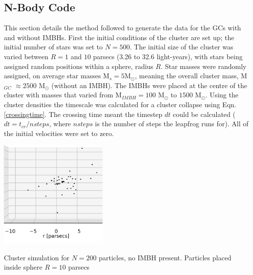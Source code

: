 \documentclass{article}
\begin{document}
\begin{multicols}{2}
\subsection{N-Body Code}
This section details the method followed to generate the data for the GCs with and without IMBHs. First the initial conditions of the cluster are set up; the initial number of stars was set to $N=500$. The initial size of the cluster was varied between $R = 1$ and $10$ parsecs (3.26 to 32.6 light-years), with stars being assigned random positions within a sphere, radius $R$. Star masses were randomly assigned, on average star masses M$_s=5$M$_{\odot}$, meaning the overall cluster mass, M$_{GC}$ $\approx 2500$ M$_{\odot}$ (without an IMBH).  The IMBHs were placed at the centre of the cluster with masses that varied from M$_{IMBH}=100$ M$_{\odot}$ to $1500$ M$_{\odot}$. Using the cluster densities the timescale was calculated for a cluster collapse using Eqn.\ref{crossingtime}. The crossing time meant the timestep $dt$ could be calculated ($dt=t_{cr}/nsteps$, where $nsteps$ is the number of steps the leapfrog runs for). All of the initial velocities were set to zero.
\vspace{2mm}
   
   \includegraphics[width=0.4\textwidth]{Cluster.png}
    
    
     {\small}{Cluster simulation for $N=200$ particles, no IMBH present. Particles placed inside sphere $R=10$ parsecs }

\vspace{2mm} 
    

\end{multicols}
\end{document}
